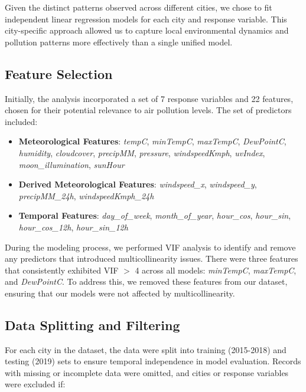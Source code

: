 \documentclass[twoside,11pt]{article}
\begin{document}
Given the distinct patterns observed across different cities, we chose to fit independent linear regression models for each city and response variable. This city-specific approach allowed us to capture local environmental dynamics and pollution patterns more effectively than a single unified model.

\subsection{Feature Selection}

Initially, the analysis incorporated a set of 7 response variables and 22 features, chosen for their potential relevance to air pollution levels. The set of predictors included:

\begin{itemize}
  \item \textbf{Meteorological Features}: \textit{tempC}, \textit{minTempC}, \textit{maxTempC}, \textit{DewPointC}, \textit{humidity}, \textit{cloudcover}, \textit{precipMM}, \textit{pressure}, \textit{windspeedKmph}, \textit{uvIndex}, \textit{moon\_illumination}, \textit{sunHour}
  \item \textbf{Derived Meteorological Features}: \textit{windspeed\_x}, \textit{windspeed\_y}, \textit{precipMM\_24h}, \textit{windspeedKmph\_24h}
  \item \textbf{Temporal Features}: \textit{day\_of\_week}, \textit{month\_of\_year}, \textit{hour\_cos}, \textit{hour\_sin}, \textit{hour\_cos\_12h}, \textit{hour\_sin\_12h}
\end{itemize}

During the modeling process, we performed VIF analysis to identify and remove any predictors that introduced multicollinearity issues. There were three features that consistently exhibited VIF $>$ 4 across all models: \textit{minTempC}, \textit{maxTempC}, and \textit{DewPointC}. To address this, we removed these features from our dataset, ensuring that our models were not affected by multicollinearity.

\subsection{Data Splitting and Filtering}

For each city in the dataset, the data were split into training (2015-2018) and testing (2019) sets to ensure temporal independence in model evaluation. Records with missing or incomplete data were omitted, and cities or response variables were excluded if:
\end{document}
